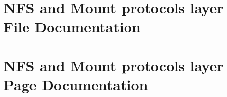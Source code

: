 \documentclass[a4paper]{book}
\begin{document}
\chapter{NFS and Mount protocols layer File Documentation}













































































\chapter{NFS and Mount protocols layer Page Documentation}

\printindex
\end{document}
